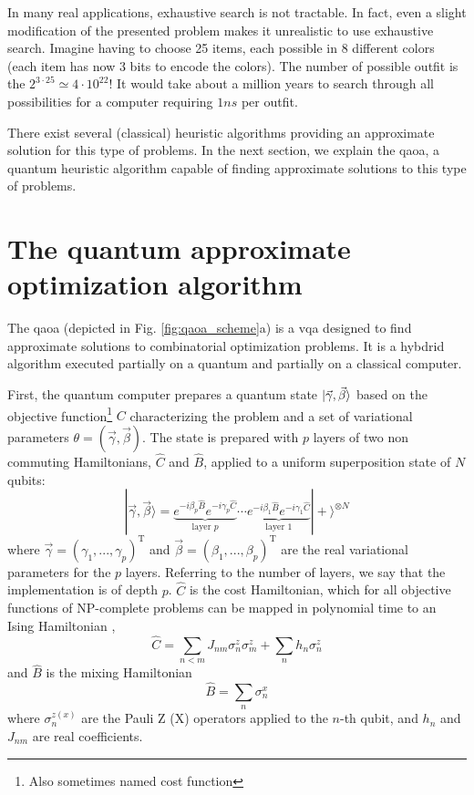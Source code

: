 In many real applications, exhaustive search is not tractable. In fact, even a slight modification of the presented problem makes it unrealistic to use exhaustive search. Imagine having to choose 25 items, each possible in 8 different colors (each item has now 3 bits to encode the colors). The number of possible outfit is the $2^{3 \cdot 25} \simeq 4\cdot 10^{22}$! It would take about a million years to search through all possibilities for a computer requiring $1\unit{ns}$ per outfit.

There exist several (classical) heuristic algorithms providing an approximate solution for this type of problems. In the next section, we explain the \gls{qaoa}, a quantum heuristic algorithm capable of finding approximate solutions to this type of problems.

\section{The quantum approximate optimization algorithm}\label{sec:qaoa}
The \gls{qaoa} \cite{Farhi2014AAlgorithm} (depicted in Fig. \ref{fig:qaoa_scheme}a) is a \gls{vqa} designed to find approximate solutions to combinatorial optimization problems. It is a hybdrid algorithm executed partially on a quantum and partially on a classical computer. 

First, the quantum computer prepares a quantum state $\ket{\vec{\gamma}, \vec{\beta}}$ based on the objective function\footnote{Also sometimes named cost function} $C$ characterizing the problem and a set of variational parameters $\theta = (\vec \gamma, \vec \beta)$. The state is prepared with $p$ layers of two non commuting Hamiltonians, $\hat C$ and $\hat B$, applied to a uniform superposition state of $N$ qubits:
\begin{equation}
    |\vec{\gamma}, \vec{\beta}\rangle=\underbrace{e^{-i \beta_{p} \hat B} e^{-i \gamma_{p} \hat C}}_{\text {layer } p} \cdots \underbrace{e^{-i \beta_{1} \hat B} e^{-i \gamma_{1} \hat C}}_{\text {layer } 1}|+\rangle^{\otimes N}
\end{equation}
where $\vec\gamma = (\gamma_1, ..., \gamma_p)^\text{T}$ and $\vec\beta = (\beta_1, ... , \beta_p)^\text{T}$ are the real variational parameters for the $p$ layers. Referring to the number of layers, we say that the implementation is of depth $p$. $\hat C$ is the cost Hamiltonian, which for all objective functions of NP-complete problems can be mapped in polynomial time to an Ising Hamiltonian \cite{Lucas2014IsingProblems},
\begin{equation}
    \hat C =\sum_{n < m} J_{n m} \sigma_{n}^z \sigma_{m}^z + \sum_{n} h_n \sigma_{n}^z
\end{equation}
and $\hat B$ is the mixing Hamiltonian 
\begin{equation}
    \hat B = \sum_{n} \sigma_n^x
\end{equation}
where $\sigma_n^{z (x)}$ are the Pauli Z (X) operators applied to the $n$-th qubit, and $h_n$ and $J_{n m}$ are real coefficients.


